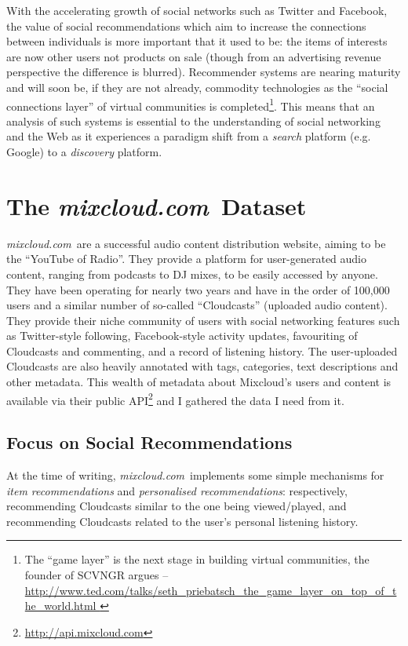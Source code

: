 \documentclass[a4paper,12pt,twoside,notitlepage]{report}
\def\mixurl{\emph{mixcloud.com}}
\begin{document}
With the accelerating growth of social networks such as Twitter and Facebook, 
the value of social recommendations which aim to increase the connections 
between individuals is more important that it used to be: the items of 
interests are now other users not products on sale (though from an advertising 
revenue perspective the difference is blurred). Recommender systems are nearing 
maturity and will soon be, if they are not already, commodity technologies as 
the ``social connections layer'' of virtual communities is completed\footnote{
The ``game layer'' is the next stage in building virtual communities, the 
founder of SCVNGR argues -- \url{
http://www.ted.com/talks/seth_priebatsch_the_game_layer_on_top_of_the_world.html
}}. 
This means that an analysis of such systems is essential to the understanding 
of social networking and the Web as it experiences a paradigm shift from a 
\emph{search} platform (e.g. Google) to a \emph{discovery} platform.


\section{The \mixurl\ Dataset}

\mixurl\ are a successful audio content distribution website, aiming to be the
``YouTube of Radio''. They provide a platform for user-generated audio content,
ranging from podcasts to DJ mixes, to be easily accessed by anyone. They have
been operating for nearly two years and have in the order of 100,000 users and a
similar number of so-called ``Cloudcasts'' (uploaded audio content). They
provide their niche community of users with social networking features such as
Twitter-style following, Facebook-style activity updates, favouriting of
Cloudcasts and commenting, and a record of listening history. The user-uploaded
Cloudcasts are also heavily annotated with tags, categories, text descriptions
and other metadata. This wealth of metadata about Mixcloud's users and content
is available via their public API\footnote{\url{http://api.mixcloud.com}} and I
gathered the data I need from it.

\subsection{Focus on Social Recommendations}
At the time of writing, \mixurl\ implements some simple mechanisms for 
\emph{item recommendations} and \emph{personalised recommendations}: 
respectively, recommending Cloudcasts similar to the one being viewed/played,
and recommending Cloudcasts related to the user's personal listening history. 
\end{document}
